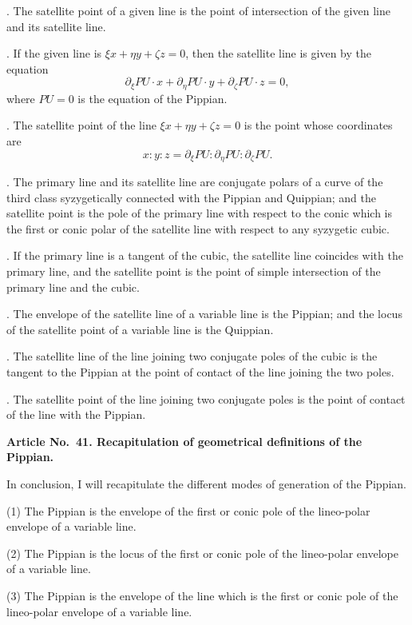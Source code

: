 \documentclass[12pt,a4paper]{article}
\theoremstyle{definition}
\begin{document}
. The satellite point of a given line is the point of
intersection of the given line and its satellite line.

. If the given line is $\xi x + \eta y + \zeta z = 0$, then the
satellite line is given by the equation
\[
\partial_{\xi}PU \cdot x + \partial_{\eta}PU \cdot y + \partial_{\zeta}PU \cdot z = 0,
\]
where $PU = 0$ is the equation of the Pippian.

. The satellite point of the line $\xi x + \eta y + \zeta z = 0$
is the point whose coordinates are
\[
x : y : z = \partial_{\xi}PU : \partial_{\eta}PU : \partial_{\zeta}PU.
\]

. The primary line and its satellite line are conjugate
polars of a curve of the third class syzygetically connected
with the Pippian and Quippian; and the satellite point is the
pole of the primary line with respect to the conic which is the
first or conic polar of the satellite line with respect to any
syzygetic cubic.

. If the primary line is a tangent of the cubic, the satellite
line coincides with the primary line, and the satellite point is
the point of simple intersection of the primary line and the cubic.

. The envelope of the satellite line of a variable line is
the Pippian; and the locus of the satellite point of a variable
line is the Quippian.

. The satellite line of the line joining two conjugate poles
of the cubic is the tangent to the Pippian at the point of contact
of the line joining the two poles.

. The satellite point of the line joining two conjugate
poles is the point of contact of the line with the Pippian.

\medskip\noindent\textbf{Article No.~41. Recapitulation of geometrical definitions of the Pippian.}

\medskip
In conclusion, I will recapitulate the different modes of
generation of the Pippian.

\smallskip
\hspace*{2em}(1) The Pippian is the envelope of the first or conic pole
of the lineo-polar envelope of a variable line.

\hspace*{2em}(2) The Pippian is the locus of the first or conic pole of
the lineo-polar envelope of a variable line.

\hspace*{2em}(3) The Pippian is the envelope of the line which is the
first or conic pole of the lineo-polar envelope of a variable line.
\end{document}
